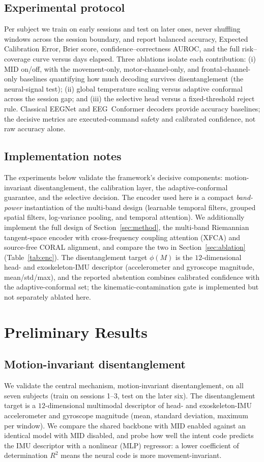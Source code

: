 \documentclass[conference]{IEEEtran}
\begin{document}
\subsection{Experimental protocol}
Per subject we train on early sessions and test on later ones, never shuffling
windows across the session boundary, and report balanced accuracy, Expected
Calibration Error, Brier score, confidence--correctness AUROC, and the full
risk--coverage curve versus days elapsed. Three ablations isolate each contribution:
(i) MID on/off, with the movement-only, motor-channel-only, and frontal-channel-only
baselines quantifying how much decoding survives disentanglement (the neural-signal
test); (ii) global temperature scaling versus adaptive conformal across the session
gap; and (iii) the selective head versus a fixed-threshold reject rule. Classical
EEGNet and EEG~Conformer decoders provide accuracy baselines; the decisive metrics
are executed-command safety and calibrated confidence, not raw accuracy alone.

\subsection{Implementation notes}
The experiments below validate the framework's decisive components: motion-invariant
disentanglement, the calibration layer, the adaptive-conformal guarantee, and the
selective decision. The encoder used here is a compact \emph{band-power}
instantiation of the multi-band design (learnable temporal filters, grouped spatial
filters, log-variance pooling, and temporal attention). We additionally implement the
full design of Section~\ref{sec:method}, the multi-band Riemannian tangent-space
encoder with cross-frequency coupling attention (XFCA) and source-free CORAL
alignment, and compare the two in Section~\ref{sec:ablation}
(Table~\ref{tab:enc}). The disentanglement target $\phi(M)$ is the $12$-dimensional head- and
exoskeleton-IMU descriptor (accelerometer and gyroscope magnitude, mean/std/max), and
the reported abstention combines calibrated confidence with the adaptive-conformal
set; the kinematic-contamination gate is implemented but not separately ablated here.

\section{Preliminary Results}\label{sec:valid}
\subsection{Motion-invariant disentanglement}
We validate the central mechanism, motion-invariant disentanglement, on all seven
subjects (train on sessions 1--3, test on the later six). The disentanglement
target is a $12$-dimensional multimodal descriptor of head- and exoskeleton-IMU
accelerometer and gyroscope magnitude (mean, standard deviation, maximum per
window). We compare the shared backbone with MID enabled against an identical model
with MID disabled, and probe how well the intent code predicts the IMU descriptor
with a nonlinear (MLP) regressor: a lower coefficient of determination $R^2$ means
the neural code is more movement-invariant.
\end{document}
